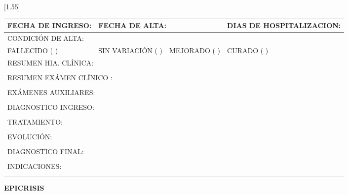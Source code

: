 \documentclass[10pt,a4paper]{article}
\begin{document}
\vspace{0.5cm}
\scalebox{1.40}[1.55]{
\begin{tabular}{|p{2.8cm}p{2.8cm}p{2.8cm}p{2.8cm}|} 
\hline 

\multicolumn{1}{|l}{\scriptsize{FECHA DE INGRESO:}}& \multicolumn{2}{l}{ \scriptsize{FECHA DE ALTA:}}& \multicolumn{1}{l|}{ \scriptsize{DIAS DE HOSPITALIZACION:}}\\
\hline 
\multicolumn{4}{|l|}{\scriptsize{CONDICI\'ON DE ALTA:}}\\
\multicolumn{1}{|l}{\scriptsize{FALLECIDO ( )}}&\multicolumn{1}{l}{\scriptsize{SIN VARIACI\'ON ( )}}&\multicolumn{1}{l}{\scriptsize{MEJORADO ( )}}&\multicolumn{1}{l|}{\scriptsize{CURADO ( )}}\\
\hline 
\multicolumn{4}{|l|}{\scriptsize{RESUMEN HIA. CL\'INICA:}}\\
\multicolumn{4}{|p{12.5cm}|}{\scriptsize{}}\\ 
\hline 
\multicolumn{4}{|l|}{\scriptsize{RESUMEN EX\'AMEN CL\'INICO :}}\\
\multicolumn{4}{|p{12.5cm}|}{\scriptsize{}}\\ 
\hline 
\multicolumn{4}{|l|}{\scriptsize{EX\'AMENES AUXILIARES:}}\\
\multicolumn{4}{|p{12.5cm}|}{\scriptsize{}}\\ 
\hline 
\multicolumn{4}{|l|}{\scriptsize{DIAGNOSTICO INGRESO:}}\\
\multicolumn{4}{|p{12.5cm}|}{\scriptsize{}}\\ 
\hline 
\multicolumn{4}{|l|}{\scriptsize{TRATAMIENTO:}}\\
\multicolumn{4}{|p{12.5cm}|}{\scriptsize{}}\\ 
\hline 
\multicolumn{4}{|l|}{\scriptsize{EVOLUCI\'ON:}}\\
\multicolumn{4}{|p{12.5cm}|}{\scriptsize{}}\\ 
\hline 
\multicolumn{4}{|l|}{\scriptsize{DIAGNOSTICO FINAL:}}\\
\multicolumn{4}{|p{12.5cm}|}{\scriptsize{}}\\ 
\hline 
\multicolumn{4}{|l|}{\scriptsize{INDICACIONES:}}\\
\multicolumn{4}{|p{12.5cm}|}{\scriptsize{}}\\ 
\hline 
\end{tabular}}
\vspace{0.6cm}
\begin{flushleft}
\begin{LARGE}
\textbf{EPICRISIS}
\end{LARGE}
\end{flushleft}
\end{document}

